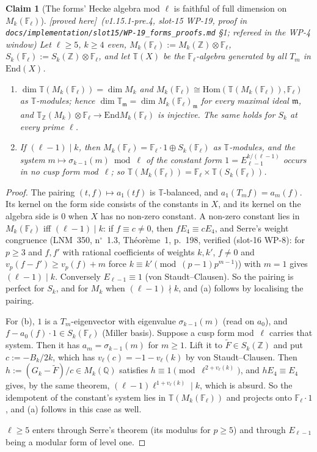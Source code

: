 \documentclass[11pt]{article}
\newtheorem{claim}[theorem]{Claim}
\theoremstyle{remark}
\newcommand{\F}{\mathbb{F}}
\newcommand{\Z}{\mathbb{Z}}
\newcommand{\Q}{\mathbb{Q}}
\newcommand{\End}{\mathrm{End}}
\newcommand{\Hom}{\mathrm{Hom}}
\newcommand{\Fl}{\F_\ell}
\newcommand{\T}{\mathbb{T}}
\newcommand{\m}{\mathfrak{m}}
\newcommand{\PROVED}{\textsf{[proved here]}}
\begin{document}
\begin{claim}[The forms' Hecke algebra mod $\ell$ is faithful of full dimension on $M_k(\Fl)$]\label{cl:mkfaithful}
\PROVED\ (v1.15.1-pre.4, slot-15 WP-19, proof in \texttt{docs/implementation/slot15/WP-19\_forms\_proofs.md} \S1; refereed in the
WP-4 window) Let $\ell\ge5$, $k\ge4$ even, $M_k(\Fl):=M_k(\Z)\otimes\Fl$, $S_k(\Fl):=S_k(\Z)\otimes\Fl$, and let $\T(X)$ be the
$\Fl$-algebra generated by all $T_m$ in $\End(X)$.
\begin{enumerate}[label=(\alph*)]
\item $\dim\T(M_k(\Fl))=\dim M_k$ and $M_k(\Fl)\cong\Hom(\T(M_k(\Fl)),\Fl)$ as $\T$-modules; hence $\dim\T_\m=\dim M_k(\Fl)_\m$ for every
  maximal ideal $\m$, and $\T_\Z(M_k)\otimes\Fl\to\End M_k(\Fl)$ is injective. The same holds for $S_k$ at every prime $\ell$.
\item If $(\ell-1)\mid k$, then $M_k(\Fl)=\Fl\cdot1\oplus S_k(\Fl)$ as $\T$-modules, and the system $m\mapsto\sigma_{k-1}(m)\bmod\ell$ of the
  constant form $1=E_{\ell-1}^{k/(\ell-1)}$ occurs in no cusp form mod~$\ell$; so $\T(M_k(\Fl))=\Fl\times\T(S_k(\Fl))$.
\end{enumerate}
\end{claim}
\begin{proof}
The pairing $(t,f)\mapsto a_1(tf)$ is $\T$-balanced, and $a_1(T_mf)=a_m(f)$. Its kernel on the form side consists of the constants in
$X$, and its kernel on the algebra side is $0$ when $X$ has no non-zero constant. A non-zero constant lies in $M_k(\Fl)$ iff
$(\ell-1)\mid k$: if $f\equiv c\neq0$, then $fE_4\equiv cE_4$, and Serre's weight congruence \cite{serre} (LNM~350, n$^\circ$~1.3, Th\'eor\`eme~1, p.~198, verified (slot-16 WP-8): for $p\ge3$ and $f,f'$ with rational coefficients of weights $k,k'$, $f\ne0$ and $v_p(f-f')\ge v_p(f)+m$ force $k\equiv k'\pmod{(p-1)p^{m-1}}$) with $m=1$
gives $(\ell-1)\mid k$. Conversely $E_{\ell-1}\equiv1$ (von Staudt--Clausen). So the pairing is perfect for $S_k$, and for $M_k$ when
$(\ell-1)\nmid k$, and (a) follows by localising the pairing.

For (b), $1$ is a $T_m$-eigenvector with eigenvalue $\sigma_{k-1}(m)$ (read on $a_0$), and $f-a_0(f)\cdot1\in S_k(\Fl)$ (Miller basis). Suppose a
cusp form mod~$\ell$ carries that system. Then it has $a_m=\sigma_{k-1}(m)$ for $m\ge1$. Lift it to $\tilde F\in S_k(\Z)$ and put
$c:=-B_k/2k$, which has $v_\ell(c)=-1-v_\ell(k)$ by von Staudt--Clausen. Then $h:=(G_k-\tilde F)/c\in M_k(\Q)$ satisfies
$h\equiv1\pmod{\ell^{2+v_\ell(k)}}$, and $hE_4\equiv E_4$ gives, by the same theorem, $(\ell-1)\ell^{1+v_\ell(k)}\mid k$, which is
absurd. So the idempotent of the constant's system lies in $\T(M_k(\Fl))$ and projects onto $\Fl\cdot1$, and (a) follows in this
case as well.

$\ell\ge5$ enters through Serre's theorem (its modulus for $p\ge5$) and through $E_{\ell-1}$ being a modular form of level one.
\end{proof}
\end{document}
